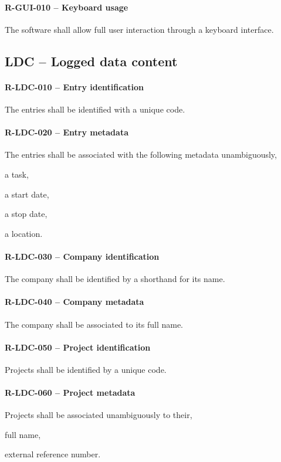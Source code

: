 \paragraph{R-GUI-010 -- Keyboard usage}
The software shall allow full user interaction through a keyboard interface.

\subsection{LDC -- Logged data content}
\paragraph{R-LDC-010 -- Entry identification}
The entries shall be identified with a unique code.

\paragraph{R-LDC-020 -- Entry metadata}
The entries shall be associated with the following metadata unambiguously,
\begin{compactitem}
\item a task,
\item a start date,
\item a stop date,
\item a location.
\end{compactitem}

\paragraph{R-LDC-030 -- Company identification}
The company shall be identified by a shorthand for its name.

\paragraph{R-LDC-040 -- Company metadata}
The company shall be associated to its full name.

\paragraph{R-LDC-050 -- Project identification}
Projects shall be identified by a unique code.

\paragraph{R-LDC-060 -- Project metadata}
Projects shall be associated unambiguously to their,
\begin{compactitem}
  \item full name,
  \item external reference number.
\end{compactitem}

